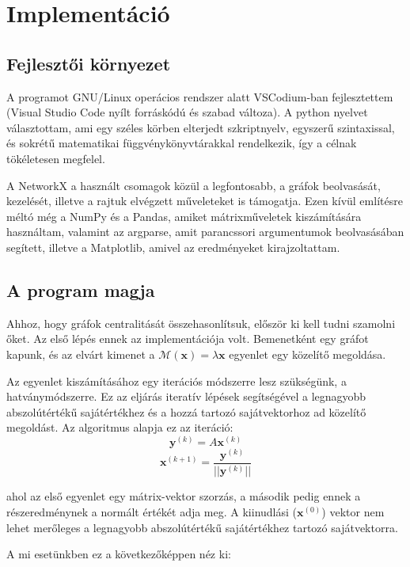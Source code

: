 \documentclass[12pt,numbers=noenddot]{report}
\begin{document}
\chapter{Implementáció}

\section{Fejlesztői környezet}

A programot GNU/Linux operácios rendszer alatt VSCodium-ban fejlesztettem 
(Visual Studio Code nyílt forráskódú és szabad változa). A python nyelvet 
választottam, ami egy széles körben elterjedt szkriptnyelv, egyszerű 
szintaxissal, és sokrétű matematikai függvénykönyvtárakkal rendelkezik,
így a célnak tökéletesen megfelel.

A NetworkX a használt csomagok közül a legfontosabb, a gráfok beolvasását,
kezelését, illetve a rajtuk elvégzett műveleteket is támogatja. Ezen kívül
említésre méltó még a NumPy és a Pandas, amiket mátrixműveletek kiszámítására
használtam, valamint az argparse, amit parancssori argumentumok beolvasásában 
segített, illetve a Matplotlib, amivel az eredményeket kirajzoltattam.

\section{A program magja}

Ahhoz, hogy gráfok centralitását összehasonlítsuk, először ki kell tudni szamolni őket.
Az első lépés ennek az implementációja volt. Bemenetként egy gráfot kapunk, és az elvárt kimenet a 
$\mathcal{M}(\boldsymbol{x}) = \lambda \boldsymbol{x}$
egyenlet egy közelítő megoldása. 

Az egyenlet kiszámításához egy iterációs módszerre lesz szükségünk, a hatványmódszerre.
Ez az eljárás iteratív lépések segítségével a legnagyobb abszolútértékű sajátértékhez
és a hozzá tartozó sajátvektorhoz ad közelítő megoldást. 
Az algoritmus alapja ez az iteráció:
$$\boldsymbol{y}^{(k)} = A \boldsymbol{x}^{(k)}$$
$$\boldsymbol{x}^{(k+1)} = \frac{\boldsymbol{y}^{(k)}}{||\boldsymbol{y}^{(k)}||}$$

ahol az első egyenlet egy mátrix-vektor szorzás, a második pedig ennek a részeredménynek a normált értékét adja meg.
A kiinudlási ($\boldsymbol{x}^{(0)}$) vektor nem lehet merőleges a legnagyobb abszolútértékű sajátértékhez tartozó sajátvektorra.

\pagebreak

A mi esetünkben ez a következőképpen néz ki:
\end{document}
